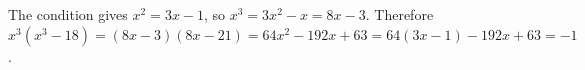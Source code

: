The condition gives $x^2=3x-1$, so $x^3=3x^2-x=8x-3$. Therefore $x^3(x^3-18)=(8x-3)(8x-21)=64x^2-192x+63=64(3x-1)-192x+63=\boxed{-1}$.
